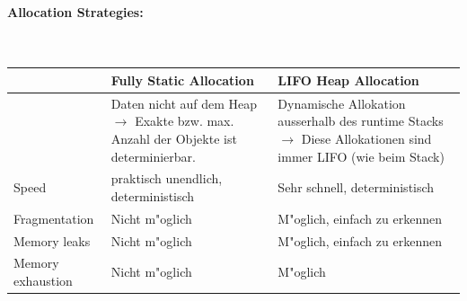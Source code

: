 \paragraph{Allocation Strategies: }~\\
\begin{tabular}{l||p{7cm}|p{7cm}|}
                        &  Fully Static Allocation & LIFO Heap Allocation\\
    \hline \hline
                        &   Daten nicht auf dem Heap $\rightarrow$ Exakte bzw. max. Anzahl der Objekte ist determinierbar. & Dynamische Allokation ausserhalb des runtime Stacks $\rightarrow$ Diese Allokationen sind immer LIFO (wie beim Stack)\\
    Speed               &   praktisch unendlich, deterministisch    & Sehr schnell, deterministisch \\
    Fragmentation       &   Nicht m"oglich                          & M"oglich, einfach zu erkennen\\
    Memory leaks        &   Nicht m"oglich                          & M"oglich, einfach zu erkennen\\
    Memory exhaustion   &   Nicht m"oglich                          & M"oglich\\



\end{tabular}

\vspace{1cm}

